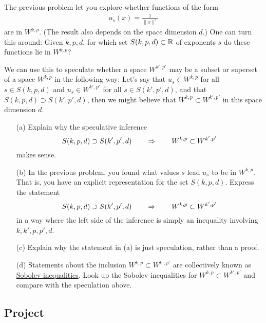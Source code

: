 \documentclass[12pt]{memoir}
\begin{document}
\begin{Ej}
    The previous problem let you explore whether functions of the form
  \begin{align*}
    u_s(x) = \frac{1}{\|x\|^s}
  \end{align*}
  are in $W^{k,p}$. (The result also depends on the space dimension
  $d$.) One can turn this around: Given $k,p,d$, for which set
  $S(k,p,d)\subset \mathbb{R}$ of exponents $s$ do these functions lie in $W^{k,p}$?

  We can use this to speculate whether a space $W^{k',p'}$ may be a
  subset or superset of a space $W^{k,p}$ in the following way: Let's
  say that $u_s \in W^{k,p}$ for all $s\in S(k,p,d)$ and 
  $u_s \in W^{k',p'}$ for all $s\in S(k',p',d)$, and that 
  $S(k,p,d) \supset S(k',p',d)$, then we might believe that 
  $W^{k,p} \subset W^{k',p'}$ in this space dimension $d$.

  \begin{itemize}
  \item[(a)] Explain why the speculative inference
  $$
    S(k,p,d) \supset S(k',p',d)
    \qquad\Rightarrow\qquad
    W^{k,p} \subset W^{k',p'}
  $$
  makes sense.

  \item[(b)] In the previous problem, you found what values $s$ lead
    $u_s$ to be in $W^{k,p}$. That is, you have an explicit
    representation for the set $S(k,p,d)$. Express the statement
    $$
    S(k,p,d) \supset S(k',p',d)
    \qquad\Rightarrow\qquad
    W^{k,p} \subset W^{k',p'}
  $$
  in a way where the left side of the inference is simply an
  inequality involving $k,k',p,p',d$.

  \item[(c)] Explain why the statement in (a) is just speculation, rather than a
    proof.

  \item[(d)] Statements about the inclusion $W^{k,p} \subset
    W^{k',p'}$ are collectively known as
    \href{https://en.wikipedia.org/wiki/Sobolev_inequality}{Sobolev
      inequalities}. Look up the Sobolev inequalities for $W^{k,p} \subset
    W^{k',p'}$ and compare with the speculation above. 
  \end{itemize}
\end{Ej}

\subsection*{Project}
\end{document}

